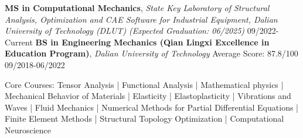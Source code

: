 



\begin{cvedu}

  \cvhonor
    { {\bf MS in Computational Mechanics}, \newline \textit{State Key Laboratory of Structural Analysis, Optimization and CAE Software for Industrial Equipment, Dalian University of Technology (DLUT) (Expected Graduation: 06/2025)} \hspace{2em} \hfill } %
    {09/2022-Current} %
  \cvhonor
    { {\bf BS in Engineering Mechanics (Qian Lingxi Excellence in Education Program)}, \newline \textit{Dalian University of Technology}  \hspace{2em} \hfill {\color{blue} Average Score: 87.8/100}} %
    {09/2018-06/2022} %


\end{cvedu}


\begin{cvparagraph}
{\normalsize{ Core Courses:}  Tensor Analysis | Functional Analysis | Mathematical physics | Mechanical Behavior of Materials | Elasticity | Elastoplasticity | Vibrations and Waves | Fluid Mechanics | Numerical Methods for Partial Differential Equations | Finite Element Methods | Structural Topology Optimization | Computational Neuroscience\\}
\end{cvparagraph}

